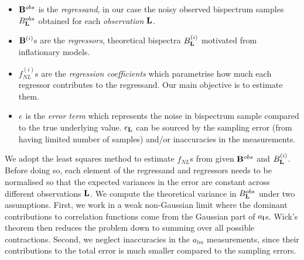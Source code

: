 \begin{itemize}
	\item $\mathbf{B}^{obs}$ is the \textit{regressand}, in our case the noisy observed bispectrum samples $B^{obs}_\mathbf{L}$ obtained for each \textit{observation} $\mathbf{L}$.
	\item $\mathbf{B}^{(i)}$s are the \textit{regressors}, theoretical bispectra $B^{(i)}_\mathbf{L}$ motivated from inflationary models.
	\item $f^{(i)}_{NL}$s are the \textit{regression coefficients} which parametrise how much each regressor contributes to the regressand. Our main objective is to estimate them.
	\item $\mathbf{\epsilon}$ is the \textit{error term} which represents the noise in bispectrum sample compared to the true underlying value. $\epsilon_\mathbf{L}$ can be sourced by the sampling error (from having limited number of samples) and/or inaccuracies in the measurements. 
\end{itemize}

We adopt the least squares method to estimate $f_{NL}$s from given $\mathbf{B}^{obs}$ and $B^{(i)}_\mathbf{L}$. Before doing so, each element of the regressand and regressors needs to be normalised so that the expected variances in the error are constant across different observations $\mathbf{L}$. We compute the theoretical variance in $B^{obs}_\mathbf{L}$ under two assumptions. First, we work in a weak non-Gaussian limit where the dominant contributions to correlation functions come from the Gaussian part of $a_\mathbf{l}$s. Wick's theorem then reduces the problem down to summing over all possible contractions. Second, we neglect inaccuracies in the $a_{lm}$ measurements, since their contributions to the total error is much smaller compared to the sampling errors.

